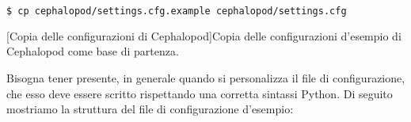             \begin{center}
                \begin{lstlisting}[language=bash, gobble=18]
                    $ cp cephalopod/settings.cfg.example cephalopod/settings.cfg
                \end{lstlisting}
                \captionsetup{textformat=empty,labelformat=empty} \vspace{-2em}
                [Copia delle configurazioni di Cephalopod]{Copia delle configurazioni d'esempio di Cephalopod come base di partenza.}
            \end{center}
            
            Bisogna tener presente, in generale quando si personalizza il file di configurazione, che esso deve essere scritto rispettando una corretta sintassi Python. Di seguito mostriamo la struttura del file di configurazione d'esempio:
            

